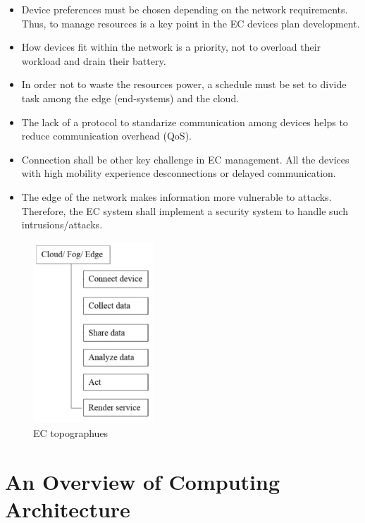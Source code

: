 \documentclass[10pt]{article}
\begin{document}
\begin{itemize}
    \item Device preferences must be chosen depending on the network
        requirements. Thus, to manage resources is a key point in the EC devices
        plan development.
    \item How devices fit within the network is a priority, not to overload
        their workload and drain their battery.
    \item In order not to waste the resources power, a schedule must be set to
        divide task among the edge (end-systems) and the cloud.
    \item The lack of a protocol to standarize communication among devices helps
        to reduce communication overhead (QoS).
    \item Connection shall be other key challenge in EC management. All the
        devices with high mobility experience desconnections or delayed
        communication.
    \item The edge of the network makes information more vulnerable to attacks.
        Therefore, the EC system shall implement a security system to handle
        such intrusions/attacks.
\end{itemize}

\begin{figure}[h!]
 \centering
  \includegraphics[width=0.4\textwidth]{ecTopography.png}
  \caption{EC topographues
   \label{ectopographies}}
\end{figure}

\section{An Overview of Computing Architecture}
\end{document}
